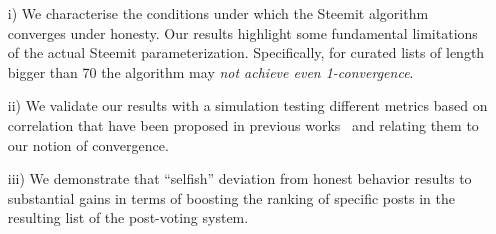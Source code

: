 \begin{itemize}
\item[i)] We characterise the conditions under which the Steemit algorithm converges under honesty. Our results highlight some fundamental limitations of the actual Steemit parameterization. Specifically, for curated lists of length bigger than 70 the algorithm may {\em not achieve even 1-convergence}. 
\item[ii)]
We validate our results with a simulation testing different metrics based on correlation that have been proposed in previous works~\cite{kendall1955rank,spearman1904proof} and relating them to our notion of convergence.
\item[iii)]
We demonstrate that ``selfish'' deviation from honest behavior results to substantial gains in terms of boosting the ranking of specific posts in the resulting list of the post-voting system.
\end{itemize}





